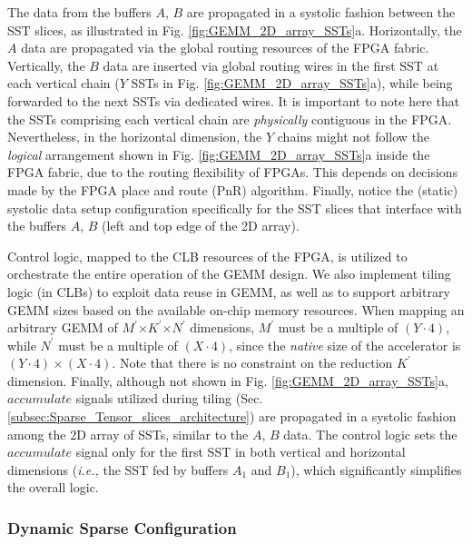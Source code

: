 The data from the buffers $A$, $B$ are propagated in a systolic fashion between the SST slices, as illustrated in Fig. \ref{fig:GEMM_2D_array_SSTs}a.
Horizontally, the $A$ data are propagated via the global routing resources of the FPGA fabric.
Vertically, the $B$ data are inserted via global routing wires in the first SST at each vertical chain ($Y$ SSTs in Fig. \ref{fig:GEMM_2D_array_SSTs}a), while being forwarded to the next SSTs via dedicated wires.
It is important to note here that the SSTs comprising each vertical chain are \textit{physically} contiguous in the FPGA.
Nevertheless, in the horizontal dimension, the $Y$ chains might not follow the \textit{logical} arrangement shown in Fig. \ref{fig:GEMM_2D_array_SSTs}a inside the FPGA fabric, due to the routing flexibility of FPGAs.
This depends on decisions made by the FPGA place and route (PnR) algorithm.
Finally, notice the (static) systolic data setup configuration specifically for the SST slices that interface with the buffers $A$, $B$ (left and top edge of the 2D array).


Control logic, mapped to the CLB resources of the FPGA, is utilized to orchestrate the entire operation of the GEMM design.
We also implement tiling logic (in CLBs) to exploit data reuse in GEMM, as well as to support arbitrary GEMM sizes based on the available on-chip memory resources.
When mapping an arbitrary GEMM of $M^\prime$$\times$$K^\prime$$\times$$N^\prime$ dimensions, $M^\prime$ must be a multiple of $(Y \cdot 4)$, while $N^\prime$ must be a multiple of $(X \cdot 4)$, since the \textit{native} size of the accelerator is $(Y \cdot 4) \times (X \cdot 4)$.
Note that there is no constraint on the reduction $K^\prime$ dimension.
Finally, although not shown in Fig. \ref{fig:GEMM_2D_array_SSTs}a, $accumulate$ signals utilized during tiling (Sec. \ref{subsec:Sparse_Tensor_slices_architecture}) are propagated in a systolic fashion among the 2D array of SSTs, similar to the $A$, $B$ data.
The control logic sets the $accumulate$ signal only for the first SST in both vertical and horizontal dimensions (\emph{i.e.,} the SST fed by buffers $A_{1}$ and $B_{1}$), which significantly simplifies the overall logic.






\subsubsection{Dynamic Sparse Configuration}

